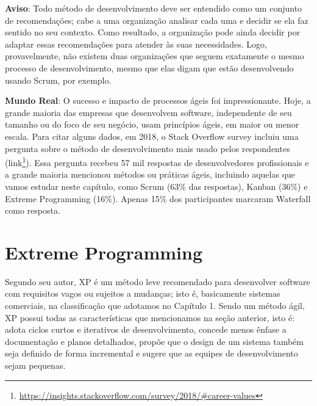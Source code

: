 \documentclass[
  11pt,
  twoside]{book}
\DeclareRobustCommand{\href}[2]{#2\footnote{\url{#1}}}
\newenvironment{esmbox}{\centering \vspace{1.5ex} \begin{tcolorbox}[breakable, colback=backcolor, width=4.9in]}{\end{tcolorbox} \vspace{1.5ex}}
\newenvironment{aviso}{\centering \vspace{1.5ex} \begin{tcolorbox}[breakable, colback=backcolor, width=4.9in]}{\end{tcolorbox} \vspace{1.5ex}}
\begin{document}
\begin{aviso} 

\textbf{Aviso}: Todo método de desenvolvimento deve ser entendido como
um conjunto de recomendações; cabe a uma organização analisar cada uma e
decidir se ela faz sentido no seu contexto. Como resultado, a
organização pode ainda decidir por adaptar essas recomendações para
atender às suas necessidades. Logo, provavelmente, não existem duas
organizações que seguem exatamente o mesmo processo de desenvolvimento,
mesmo que elas digam que estão desenvolvendo usando Scrum, por exemplo.

\end{aviso} 


\begin{esmbox} 

\textbf{Mundo Real}: O sucesso e impacto de processos ágeis foi
impressionante. Hoje, a grande maioria das empresas que desenvolvem
software, independente de seu tamanho ou do foco de seu negócio, usam
princípios ágeis, em maior ou menor escala. Para citar alguns dados, em
2018, o Stack Overflow survey incluiu uma pergunta sobre o método de
desenvolvimento mais usado pelos respondentes
(\href{https://insights.stackoverflow.com/survey/2018/\#career-values}{link}).
Essa pergunta recebeu 57 mil respostas de desenvolvedores profissionais
e a grande maioria mencionou métodos ou práticas ágeis, incluindo
aquelas que vamos estudar neste capítulo, como Scrum (63\% das
respostas), Kanban (36\%) e Extreme Programming (16\%). Apenas 15\% dos
participantes marcaram Waterfall como resposta.

\end{esmbox}

\hypertarget{extreme-programming}{%
\section{Extreme Programming}\label{extreme-programming}}

 Segundo seu autor, XP é um método leve
recomendado para desenvolver software com requisitos vagos ou sujeitos a
mudanças; isto é, basicamente sistemas comerciais, na classificação que
adotamos no Capítulo 1. Sendo um método ágil, XP possui todas as
características que mencionamos na seção anterior, isto é: adota ciclos
curtos e iterativos de desenvolvimento, concede menos ênfase a
documentação e planos detalhados, propõe que o design de um sistema
também seja definido de forma incremental e sugere que as equipes de
desenvolvimento sejam pequenas.
\end{document}
